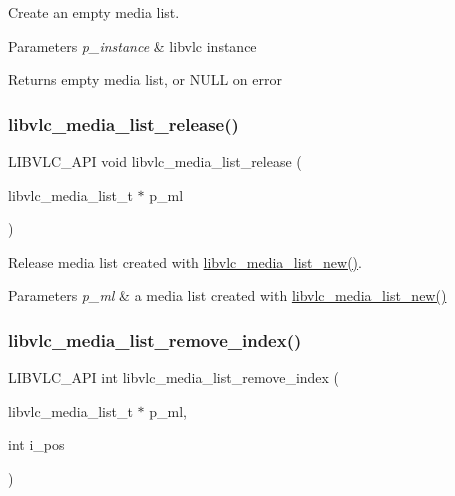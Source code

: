 Create an empty media list.


\begin{DoxyParams}{Parameters}
{\em p\+\_\+instance} & libvlc instance \\
\hline
\end{DoxyParams}
\begin{DoxyReturn}{Returns}
empty media list, or N\+U\+LL on error 
\end{DoxyReturn}
\mbox{\label{group__libvlc__media__list_ga690973281c2f7f32cd366914a08c68dc}} 
\subsubsection{\texorpdfstring{libvlc\+\_\+media\+\_\+list\+\_\+release()}{libvlc\_media\_list\_release()}}
{\footnotesize\ttfamily L\+I\+B\+V\+L\+C\+\_\+\+A\+PI void libvlc\+\_\+media\+\_\+list\+\_\+release (\begin{DoxyParamCaption}\item[{libvlc\+\_\+media\+\_\+list\+\_\+t $\ast$}]{p\+\_\+ml }\end{DoxyParamCaption})}

Release media list created with \hyperlink{group__libvlc__media__list_ga441500e86c4b21cb32afbc96a0733f57}{libvlc\+\_\+media\+\_\+list\+\_\+new()}.


\begin{DoxyParams}{Parameters}
{\em p\+\_\+ml} & a media list created with \hyperlink{group__libvlc__media__list_ga441500e86c4b21cb32afbc96a0733f57}{libvlc\+\_\+media\+\_\+list\+\_\+new()} \\
\hline
\end{DoxyParams}
\mbox{\label{group__libvlc__media__list_ga19bdb775f747bd6aaf31b542e600bb87}} 
\subsubsection{\texorpdfstring{libvlc\+\_\+media\+\_\+list\+\_\+remove\+\_\+index()}{libvlc\_media\_list\_remove\_index()}}
{\footnotesize\ttfamily L\+I\+B\+V\+L\+C\+\_\+\+A\+PI int libvlc\+\_\+media\+\_\+list\+\_\+remove\+\_\+index (\begin{DoxyParamCaption}\item[{libvlc\+\_\+media\+\_\+list\+\_\+t $\ast$}]{p\+\_\+ml,  }\item[{int}]{i\+\_\+pos }\end{DoxyParamCaption})}

